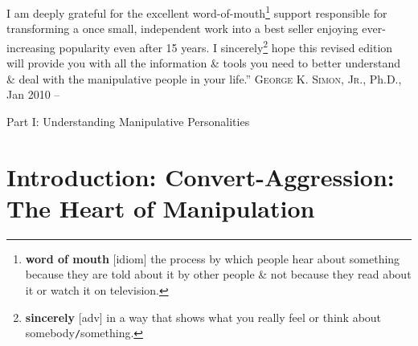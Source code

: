 \documentclass[oneside]{book}
\numberwithin{equation}{section}
\begin{document}
I am deeply grateful for the excellent word-of-mouth\footnote{\textbf{word of mouth} [idiom] the process by which people hear about something because they are told about it by other people \& not because they read about it or watch it on television.} support responsible for transforming a once small, independent work into a best seller  enjoying ever-increasing popularity even after 15 years. I sincerely\footnote{\textbf{sincerely} [adv] in a way that shows what you really feel or think about somebody\texttt{/}something.} hope this revised edition will provide you with all the information \& tools you need to better understand \& deal with the manipulative people in your life.'' \textsc{George K. Simon, Jr.}, Ph.D., Jan 2010 -- \cite[Author's note on the revised edition]{Simon2010}

\begin{center}\huge
	Part I: Understanding Manipulative Personalities
\end{center}

\section*{Introduction: Convert-Aggression: The Heart of Manipulation}
\end{document}
